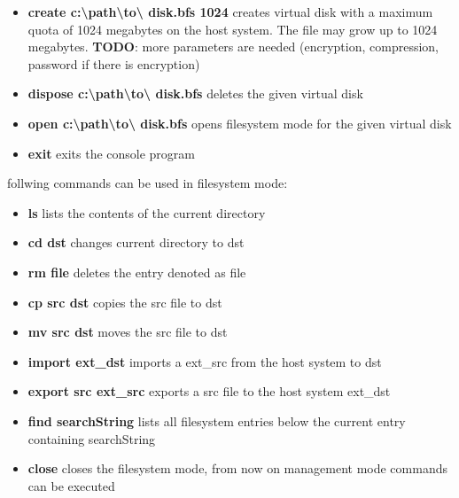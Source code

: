 \begin{itemize}
  \item{\textbf{create c:\textbackslash path\textbackslash to\textbackslash
  disk.bfs 1024}} creates virtual disk with a maximum quota of 1024 megabytes on the host system. The file may grow up to 1024 megabytes.
  \textbf{TODO}: more parameters are needed (encryption, compression, password if there is encryption)
  \item {\textbf{dispose c:\textbackslash path\textbackslash to\textbackslash
  disk.bfs}} deletes the given virtual disk
  \item {\textbf{open c:\textbackslash path\textbackslash to\textbackslash
  disk.bfs}} opens filesystem mode for the given virtual disk
  \item {\textbf{exit}} exits the console program
\end{itemize}

follwing commands can be used in filesystem mode:

\begin{itemize}
  \item {\textbf{ls}} lists the contents of the current directory
  \item {\textbf{cd dst}} changes current directory to dst
  \item {\textbf{rm file}} deletes the entry denoted as file
  \item {\textbf{cp src dst}} copies the src file to dst 
  \item {\textbf{mv src dst}} moves the src file to dst
  \item {\textbf{import ext\_dst}} imports a ext\_src from the host system to dst
  \item {\textbf{export src ext\_src}} exports a src file to the host system
  ext\_dst
  \item {\textbf{find searchString}} lists all filesystem entries below the
  current entry containing searchString
  \item {\textbf{close}} closes the filesystem mode, from now on management mode
  commands can be executed
\end{itemize}


